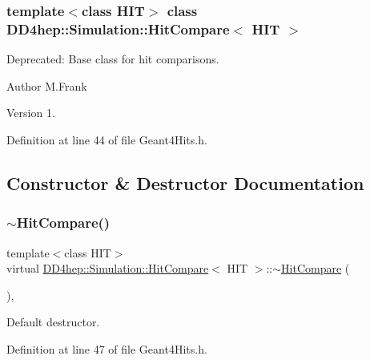 \subsubsection*{template$<$class H\+IT$>$\newline
class D\+D4hep\+::\+Simulation\+::\+Hit\+Compare$<$ H\+I\+T $>$}

Deprecated\+: Base class for hit comparisons. 

\begin{DoxyAuthor}{Author}
M.\+Frank 
\end{DoxyAuthor}
\begin{DoxyVersion}{Version}
1. 
\end{DoxyVersion}


Definition at line 44 of file Geant4\+Hits.\+h.



\subsection{Constructor \& Destructor Documentation}
\hypertarget{class_d_d4hep_1_1_simulation_1_1_hit_compare_a33e13448c6cda44f7d56a13e414635b3}{}\label{class_d_d4hep_1_1_simulation_1_1_hit_compare_a33e13448c6cda44f7d56a13e414635b3} 
\subsubsection{\texorpdfstring{$\sim$\+Hit\+Compare()}{~HitCompare()}}
{\footnotesize\ttfamily template$<$class H\+IT$>$ \\
virtual \hyperlink{class_d_d4hep_1_1_simulation_1_1_hit_compare}{D\+D4hep\+::\+Simulation\+::\+Hit\+Compare}$<$ H\+IT $>$\+::$\sim$\hyperlink{class_d_d4hep_1_1_simulation_1_1_hit_compare}{Hit\+Compare} (\begin{DoxyParamCaption}{ }\end{DoxyParamCaption})\hspace{0.3cm}{\ttfamily [inline]}, {\ttfamily [virtual]}}



Default destructor. 



Definition at line 47 of file Geant4\+Hits.\+h.



